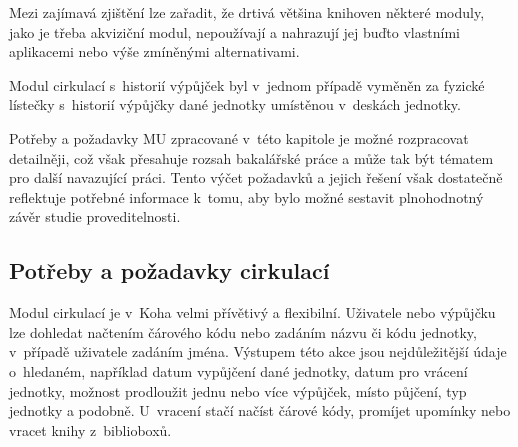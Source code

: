 \documentclass[
	11pt, oneside, printed, final, palatino, monochrome
	microtype,
	table,   %
	lof,     %
	lot     %
]{fithesis3}
\begin{document}
{Mezi zajímavá zjištění lze zařadit, že drtivá většina knihoven některé moduly, jako je třeba akviziční modul, nepoužívají a nahrazují jej buďto vlastními aplikacemi nebo výše zmíněnými alternativami.

Modul cirkulací s~historií výpůjček byl v~jednom případě vyměněn za fyzické lístečky s~historií výpůjčky dané jednotky umístěnou v~deskách jednotky. 

Potřeby a požadavky MU zpracované v~této kapitole je možné rozpracovat detailněji, což však přesahuje rozsah bakalářské práce a může tak být tématem pro další navazující práci. Tento výčet požadavků a jejich řešení však dostatečně reflektuje potřebné informace k~tomu, aby bylo možné sestavit plnohodnotný závěr studie proveditelnosti.

\subsection{Potřeby a požadavky cirkulací}

Modul cirkulací je v~Koha velmi přívětivý a flexibilní. Uživatele nebo výpůjčku lze dohledat načtením čárového kódu nebo zadáním názvu či kódu jednotky, v~případě uživatele zadáním jména. Výstupem této akce jsou nejdůležitější údaje o~hledaném, například datum vypůjčení dané jednotky, datum pro vrácení jednotky, možnost prodloužit jednu nebo více výpůjček, místo půjčení, typ jednotky a podobně. U~vracení stačí načíst čárové kódy, promíjet upomínky nebo vracet knihy z~biblioboxů.

}
\end{document}
